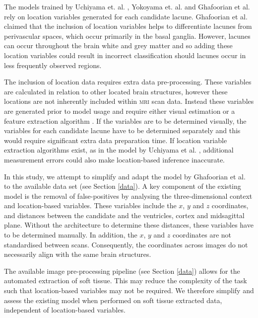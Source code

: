 The models trained by Uchiyama et. al. \cite{UchiyamaYoshikazu2007Ioad}, Yokoyama et. al. \cite{Yokoyama2007} and Ghafoorian et al. \cite{GhafoorianM.2017Dml3} rely on location variables generated for each candidate lacune. Ghafoorian et al. claimed that the inclusion of location variables helps to differentiate lacunes from perivascular spaces, which occur primarily in the basal ganglia. However, lacunes can occur throughout the brain white and grey matter \cite{WardlawJm2013Mosc} and so adding these location variables could result in incorrect classification should lacunes occur in less frequently observed regions.

The inclusion of location data requires extra data pre-processing. These variables are calculated in relation to other located brain structures, however these locations are not inherently included within \textsc{mri} scan data. Instead these variables are generated prior to model usage and require either visual estimation or a feature extraction algorithm \cite{Uchiyama2007b, UchiyamaYoshikazu2007Ioad}. If the variables are to be determined visually, the variables for each candidate lacune have to be determined separately and this would require significant extra data preparation time. If location variable extraction algorithms exist, as in the model by Uchiyama et al. \cite{UchiyamaYoshikazu2007Ioad}, additional measurement errors could also make location-based inference inaccurate.

In this study, we attempt to simplify and adapt the model by Ghafoorian et al. \cite{GhafoorianM.2017Dml3} to the available data set (see Section \ref{data}). A key component of the existing model is the removal of false-positives by analysing the three-dimensional context and location-based variables. These variables include the $x$, $y$ and $z$ coordinates, and distances between the candidate and the ventricles, cortex and midsagittal plane. Without the architecture to determine these distances, these variables have to be determined manually. In addition, the  $x$, $y$ and $z$ coordinates are not standardised between scans. Consequently, the coordinates across images do not necessarily align with the same brain structures.

The available image pre-processing pipeline (see Section \ref{data}) allows for the automated extraction of soft tissue. This may reduce the complexity of the task such that location-based variables may not be required. We therefore simplify and assess the existing model when performed on soft tissue extracted data, independent of location-based variables.


